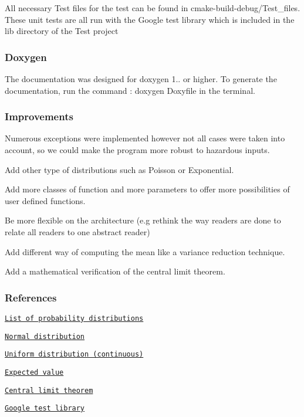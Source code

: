 All necessary Test files for the test can be found in cmake-\/build-\/debug/\+Test\+\_\+files. These unit tests are all run with the Google test library which is included in the lib directory of the Test project \subsubsection*{Doxygen}

The documentation was designed for doxygen 1.. or higher. To generate the documentation, run the command \+: \textquotesingle{}doxygen Doxyfile\textquotesingle{} in the terminal.

\subsubsection*{Improvements}


\begin{DoxyEnumerate}
\item Numerous exceptions were implemented however not all cases were taken into account, so we could make the program more robust to hazardous inputs.
\item Add other type of distributions such as Poisson or Exponential.
\item Add more classes of function and more parameters to offer more possibilities of user defined functions.
\item Be more flexible on the architecture (e.\+g rethink the way readers are done to relate all readers to one abstract reader)
\item Add different way of computing the mean like a variance reduction technique.
\item Add a mathematical verification of the central limit theorem.
\end{DoxyEnumerate}

\subsubsection*{References}


\begin{DoxyItemize}
\item \href{https://en.wikipedia.org/wiki/List_of_probability_distributions}{\tt List of probability distributions}
\item \href{https://en.wikipedia.org/wiki/Normal_distribution}{\tt Normal distribution}
\item \href{https://en.wikipedia.org/wiki/Uniform_distribution_(continuous)}{\tt Uniform distribution (continuous)}
\item \href{https://en.wikipedia.org/wiki/Expected_value}{\tt Expected value}
\item \href{https://en.wikipedia.org/wiki/Central_limit_theorem}{\tt Central limit theorem}
\item \href{https://github.com/google/googletest}{\tt Google test library} 
\end{DoxyItemize}